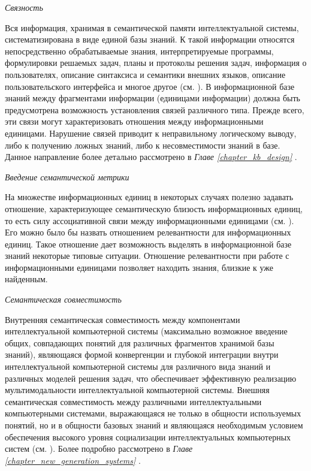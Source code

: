\textit{Связность}

Вся информация, хранимая в семантической памяти интеллектуальной системы, систематизирована в виде единой базы знаний. К такой информации относятся непосредственно обрабатываемые знания, интерпретируемые программы, формулировки решаемых задач, планы и протоколы решения задач, информация о пользователях, описание синтаксиса и семантики внешних языков, описание пользовательского интерфейса и многое другое (см. ). В информационной базе знаний между фрагментами информации (единицами информации) должна быть предусмотрена возможность установления связей различного типа. Прежде всего, эти связи могут характеризовать отношения между информационными единицами. Нарушение связей приводит к неправильному логическому выводу, либо к получению ложных знаний, либо к несовместимости знаний в базе. Данное направление более детально рассмотрено в \textit{Главе \ref{chapter_kb_design} }.

\textit{Введение семантической метрики}

На множестве информационных единиц в некоторых случаях полезно задавать отношение, характеризующее семантическую близость информационных единиц, то есть силу ассоциативной связи между информационными единицами (см. ). Его можно было бы назвать отношением релевантности для информационных единиц. Такое отношение дает возможность выделять в информационной базе знаний некоторые типовые ситуации. Отношение релевантности при работе с информационными единицами позволяет находить знания, близкие к уже найденным.

\textit{Семантическая совместимость}

Внутренняя семантическая совместимость между компонентами интеллектуальной компьютерной системы (максимально возможное введение общих, совпадающих понятий для различных фрагментов хранимой базы знаний), являющаяся формой конвергенции и глубокой интеграции внутри интеллектуальной компьютерной системы для различного вида знаний и различных моделей решения задач, что обеспечивает эффективную реализацию мультимодальности интеллектуальной компьютерной системы. Внешняя семантическая совместимость между различными интеллектуальными компьютерными системами, выражающаяся не только в общности используемых понятий, но и в общности базовых знаний и являющаяся необходимым условием обеспечения высокого уровня социализации интеллектуальных компьютерных систем (см. ). Более подробно рассмотрено в \textit{Главе \ref{chapter_new_generation_systems} }.


